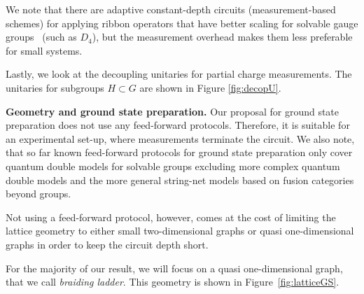 \documentclass[a4paper,twocolumn,11pt]{quantumarticle}
\begin{document}
We note that there are adaptive constant-depth circuits (measurement-based schemes) for applying ribbon operators that have better scaling for solvable gauge groups~\cite{bravyi2022adaptive} (such as $D_4$), but the measurement overhead makes them less preferable for small systems. 

Lastly, we look at the decoupling unitaries for partial charge measurements. The unitaries for subgroups $H\subset G$ are shown in Figure \ref{fig:decopU}. 


\textbf{Geometry and ground state preparation.}
Our proposal for ground state preparation does not use any feed-forward protocols. Therefore, it is suitable for an experimental set-up, where measurements terminate the circuit. We also note, that so far known feed-forward protocols for ground state preparation only cover quantum double models for solvable groups excluding more complex quantum double models and the more general string-net models based on fusion categories beyond groups.

Not using a feed-forward protocol, however, comes at the cost of limiting the lattice geometry to either small two-dimensional graphs or quasi one-dimensional graphs in order to keep the circuit depth short.

For the majority of our result, we will focus on a quasi one-dimensional graph, that we call \emph{braiding ladder}. 
This geometry is shown in Figure~\ref{fig:latticeGS}. 
\end{document}

